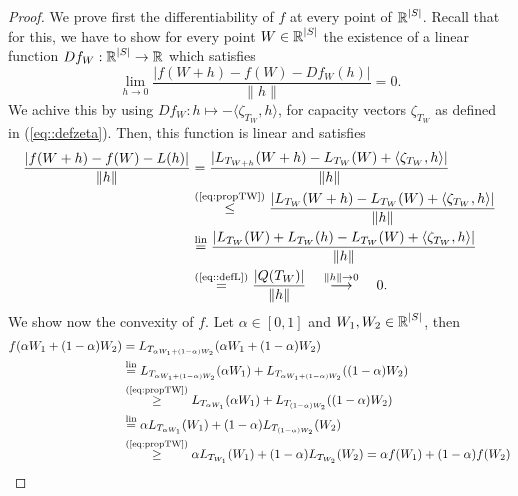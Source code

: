 \documentclass[
     12pt,         %
     a4paper,      %
     BCOR=10mm,     %
     DIV=14,        %
     ]{scrreprt}
\begin{document}
    \begin{proof}[Proof]
        We prove first the differentiability of $f$ at every point of $\operatorname{\mathbb{R}}^{|S|}$. Recall that for this, we have to show for every point $W\in \operatorname{\mathbb{R}}^{|S|}$ the existence of a linear function ${Df_{W} : \operatorname{\mathbb{R}}^{|S|}
        \to \operatorname{\mathbb{R}}}$  
        which satisfies
        \[\lim_{h \to 0}\frac{|f(W+h) - f(W) - Df_{W}(h) |}{\|h\|} = 0. \]
        We achive this by using $Df_{W} : h \mapsto -\langle \zeta_{T_W}, h \rangle $, for capacity vectors $\zeta_{T_W}$ as defined in (\ref{eq::defzeta}). Then, this function is linear and satisfies
        \begin{align*}
            \frac{|f(W+h) - f(W) - L(h) |}{\|h\|} &= \frac{|L_{T_{W+h}}(W+h) - L_{T_{W}}(W) + \langle \zeta_{T_W}, h \rangle |}{\|h\|} \\ 
                                                &\overset {\text{(\ref{eq:propTW})}}\le \frac{|L_{T_{W}}(W+h) - L_{T_{W}}(W) + \langle \zeta_{T_W}, h \rangle |}{\|h\|} \\
                                                &\overset {\text{lin}}= \frac{|L_{T_{W}}(W) + L_{T_{W}}(h) - L_{T_{W}}(W) + \langle \zeta_{T_W}, h \rangle |}{\|h\|} \\
                                                &\overset {\text{(\ref{eq::defL})}}= \frac{|Q(T_W)|}{\|h\|} \quad \overset{\|h\|\to 0}\longrightarrow \quad 0.
        \end{align*}
        We show now the convexity of $f$. Let $\alpha \in [0,1]$ and $W_1, W_2 \in \operatorname{\mathbb{R}}^{|S|}$, then
        \begin{align*}
            f(\alpha W_1 + (1- \alpha)W_2) &= L_{T_{\alpha W_1 + (1- \alpha)W_2}}(\alpha W_1 + (1- \alpha)W_2) \\
                                        &\overset {\text{lin}}= L_{T_{\alpha W_1 + (1- \alpha)W_2}}(\alpha W_1) + L_{T_{\alpha W_1 + (1- \alpha)W_2}}((1-\alpha) W_2)\\
                                        &\overset {\text{(\ref{eq:propTW})}}\ge L_{T_{\alpha W_1}}(\alpha W_1) + L_{T_{(1-\alpha) W_2}}((1- \alpha) W_2) \\
                                        &\overset {\text{lin}}= \alpha L_{T_{\alpha W_1}}(W_1) + (1-\alpha) L_{T_{(1-\alpha) W_2}}(W_2) \\ 
                                        &\overset {\text{(\ref{eq:propTW})}}\ge \alpha L_{T_{W_1}}(W_1) + (1-\alpha) L_{T_{W_2}}(W_2) = \alpha f(W_1) + (1-\alpha) f(W_2)
        \end{align*}
    \end{proof}
    
\end{document}
